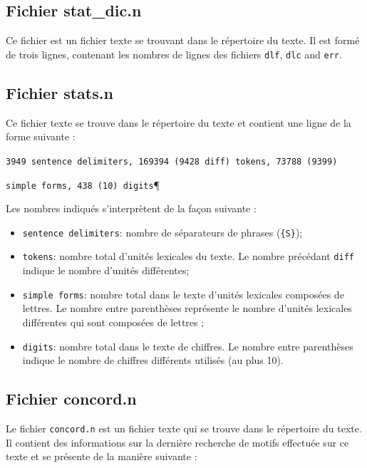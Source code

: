 \subsection{Fichier stat\_dic.n}
Ce fichier est un fichier texte se trouvant dans le répertoire du texte. Il est formé de trois
lignes, contenant les nombres de lignes des fichiers \verb+dlf+, \verb+dlc+ and \verb+err+.

\subsection{Fichier stats.n}
Ce fichier texte se trouve dans le répertoire du texte et contient une ligne de la forme
suivante :


\bigskip
\verb$3949 sentence delimiters, 169394 (9428 diff) tokens, 73788 (9399)$

\verb$simple forms, 438 (10) digits$\P

\bigskip
\noindent Les nombres indiqués s’interprètent de la façon suivante :

\begin{itemize}
  \item \verb+sentence delimiters+: nombre de séparateurs de phrases
  (\verb+{S}+);

  \item \verb+tokens+: nombre total d’unités lexicales du texte. Le nombre précédant \verb+diff+
  indique le nombre d’unités différentes;

  \item \verb+simple forms+: nombre total dans le texte d’unités lexicales composées de lettres. Le
  	  nombre entre parenthèses représente le nombre d’unités lexicales différentes qui sont
  	  composées de
lettres ;

  \item \verb+digits+: nombre total dans le texte de chiffres. Le nombre entre parenthèses indique
le nombre de chiffres différents utilisés (au plus 10).

\end{itemize}


\subsection{Fichier concord.n}
Le fichier \verb+concord.n+ est un fichier texte qui se trouve dans le répertoire du texte. Il
contient des informations sur la dernière recherche de motifs effectuée sur ce texte et se
présente de la manière suivante :


